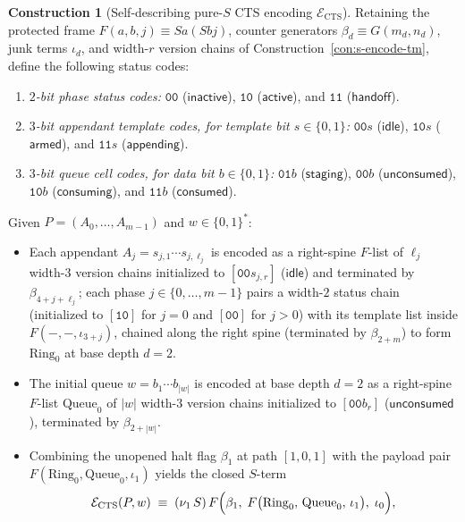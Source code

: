 \documentclass[11pt,reqno]{amsart}
\numberwithin{equation}{section}
\theoremstyle{plain}
\theoremstyle{definition}
\newtheorem{construction}[theorem]{Construction}
\theoremstyle{remark}
\begin{document}
\begin{construction}[Self-describing pure-$S$ CTS encoding $\mathcal{E}_{\mathrm{CTS}}$]\label{con:cts-encode}
Retaining the protected frame $F(a,b,j) \equiv S a(S b j)$, counter generators $\beta_d \equiv G(m_d, n_d)$, junk terms $\iota_d$, and width-$r$ version chains of Construction~\ref{con:s-encode-tm}, define the following status codes:
\begin{enumerate}[label=(\roman*),leftmargin=2.2em]
  \item \emph{$2$-bit phase status codes:} $\mathtt{00}$ ($\mathsf{inactive}$), $\mathtt{10}$ ($\mathsf{active}$), and $\mathtt{11}$ ($\mathsf{handoff}$).
  \item \emph{$3$-bit appendant template codes, for template bit $s \in \{0,1\}$:} $\mathtt{00}s$ ($\mathsf{idle}$), $\mathtt{10}s$ ($\mathsf{armed}$), and $\mathtt{11}s$ ($\mathsf{appending}$).
  \item \emph{$3$-bit queue cell codes, for data bit $b \in \{0,1\}$:} $\mathtt{01}b$ ($\mathsf{staging}$), $\mathtt{00}b$ ($\mathsf{unconsumed}$), $\mathtt{10}b$ ($\mathsf{consuming}$), and $\mathtt{11}b$ ($\mathsf{consumed}$).
\end{enumerate}
Given $P = (A_0, \dots, A_{m-1})$ and $w \in \{0,1\}^*$:
\begin{itemize}[leftmargin=2.0em]
  \item Each appendant $A_j = s_{j,1}\cdots s_{j,\ell_j}$ is encoded as a right-spine $F$-list of $\ell_j$ width-$3$ version chains initialized to $[\mathtt{00}s_{j,r}]$ ($\mathsf{idle}$) and terminated by $\beta_{4+j+\ell_j}$; each phase $j \in \{0,\dots,m-1\}$ pairs a width-$2$ status chain (initialized to $[\mathtt{10}]$ for $j = 0$ and $[\mathtt{00}]$ for $j > 0$) with its template list inside $F(-,-,\iota_{3+j})$, chained along the right spine (terminated by $\beta_{2+m}$) to form $\mathrm{Ring}_0$ at base depth $d = 2$.
  \item The initial queue $w = b_1\cdots b_{|w|}$ is encoded at base depth $d = 2$ as a right-spine $F$-list $\mathrm{Queue}_0$ of $|w|$ width-$3$ version chains initialized to $[\mathtt{00}b_r]$ ($\mathsf{unconsumed}$), terminated by $\beta_{2+|w|}$.
  \item Combining the unopened halt flag $\beta_1$ at path $[1,0,1]$ with the payload pair $F(\mathrm{Ring}_0, \mathrm{Queue}_0, \iota_1)$ yields the closed $S$-term
  \begin{equation}\label{eq:cts-encode-root}
    \mathcal{E}_{\mathrm{CTS}}(P, w) \;\equiv\; (\nu_1\,S)\,F\Bigl(\beta_1,\; F\bigl(\mathrm{Ring}_0,\, \mathrm{Queue}_0,\, \iota_1\bigr),\; \iota_0\Bigr),

\end{equation}
\end{itemize}
\end{construction}
\end{document}
